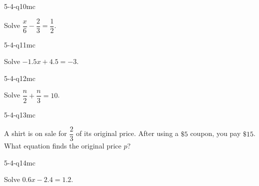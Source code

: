 \begin{practiceQuestion}{5-4-q10}{mc}
\begin{questionText}
Solve $\dfrac{x}{6} - \dfrac{2}{3} = \dfrac{1}{2}$.
\end{questionText}
\end{practiceQuestion}

\begin{practiceQuestion}{5-4-q11}{mc}
\begin{questionText}
Solve $-1.5x + 4.5 = -3$.
\end{questionText}
\end{practiceQuestion}

\begin{practiceQuestion}{5-4-q12}{mc}
\begin{questionText}
Solve $\dfrac{n}{2} + \dfrac{n}{3} = 10$.
\end{questionText}
\end{practiceQuestion}

\begin{practiceQuestion}{5-4-q13}{mc}
\begin{questionText}
A shirt is on sale for $\dfrac{2}{3}$ of its original price. After using a $\$5$ coupon, you pay $\$15$. What equation finds the original price $p$?
\end{questionText}
\end{practiceQuestion}

\begin{practiceQuestion}{5-4-q14}{mc}
\begin{questionText}
Solve $0.6x - 2.4 = 1.2$.
\end{questionText}
\end{practiceQuestion}

